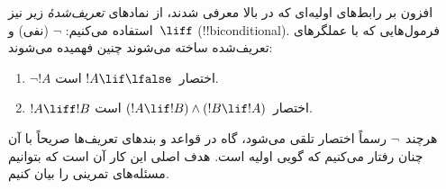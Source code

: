 \documentclass[../../../include/open-logic-section]{subfiles}
\begin{document}
افزون بر رابط‌های اولیه‌ای که در بالا معرفی شدند، از نمادهای
\emph{تعریف‌شدهٔ} زیر نیز استفاده می‌کنیم: $\lnot$ (نفی) و~$\liff$
(!!{biconditional}). فرمول‌هایی که با عملگرهای تعریف‌شده ساخته می‌شوند
چنین فهمیده می‌شوند:
\begin{enumerate}
\item $\lnot !A$ اختصار~$!A \lif \lfalse$ است.

\item $!A \liff !B$ اختصار~$(!A \lif !B) \land (!B \lif !A)$ است.
\end{enumerate}

هرچند~$\lnot$ رسماً اختصار تلقی می‌شود، گاه در قواعد و بندهای تعریف‌ها
صریحاً با آن چنان رفتار می‌کنیم که گویی اولیه است. هدف اصلی این کار آن
است که بتوانیم مسئله‌های تمرینی را بیان کنیم.
\end{document}

